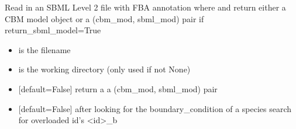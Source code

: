 \documentclass[letterpaper,10pt,english]{sphinxmanual}
\begin{document}
\begin{fulllineitems}
\label{\detokenize{modules_doc:cbmpy.CBXML.sbml_readSBML2FBA}}
\pysigstartsignatures
{}
\pysigstopsignatures
\sphinxAtStartPar
Read in an SBML Level 2 file with FBA annotation where and return either a CBM model object
or a (cbm\_mod, sbml\_mod) pair if return\_sbml\_model=True
\begin{itemize}
\item {} 
\sphinxAtStartPar
{} is the filename

\item {} 
\sphinxAtStartPar
{} is the working directory (only used if not None)

\item {} 
\sphinxAtStartPar
{} {[}default=False{]} return a a (cbm\_mod, sbml\_mod) pair

\item {} 
\sphinxAtStartPar
{} {[}default=False{]} after looking for the boundary\_condition of a species search for overloaded id’s \textless{}id\textgreater{}\_b

\end{itemize}

\end{fulllineitems}

\end{document}
